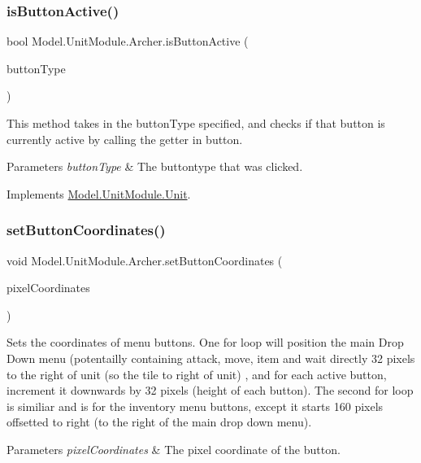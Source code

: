 \subsubsection{\texorpdfstring{is\+Button\+Active()}{isButtonActive()}}
{\footnotesize\ttfamily bool Model.\+Unit\+Module.\+Archer.\+is\+Button\+Active (\begin{DoxyParamCaption}\item[{\hyperlink{namespace_model_ac76b3489c9d704f49912608bd36cd0e7}{Button\+Type}}]{button\+Type }\end{DoxyParamCaption})\hspace{0.3cm}{\ttfamily [inline]}}

This method takes in the button\+Type specified, and checks if that button is currently active by calling the getter in button. 
\begin{DoxyParams}{Parameters}
{\em button\+Type} & The buttontype that was clicked. \\
\hline
\end{DoxyParams}


Implements \hyperlink{interface_model_1_1_unit_module_1_1_unit_a3931ef1523507e7261411dc79ee4e4af}{Model.\+Unit\+Module.\+Unit}.

\hypertarget{class_model_1_1_unit_module_1_1_archer_ad1e9c182bc11a0ea83134421a24c7987}{}\label{class_model_1_1_unit_module_1_1_archer_ad1e9c182bc11a0ea83134421a24c7987} 
\subsubsection{\texorpdfstring{set\+Button\+Coordinates()}{setButtonCoordinates()}}
{\footnotesize\ttfamily void Model.\+Unit\+Module.\+Archer.\+set\+Button\+Coordinates (\begin{DoxyParamCaption}\item[{Vector2}]{pixel\+Coordinates }\end{DoxyParamCaption})\hspace{0.3cm}{\ttfamily [inline]}}

Sets the coordinates of menu buttons. One for loop will position the main Drop Down menu (potentailly containing attack, move, item and wait directly 32 pixels to the right of unit (so the tile to right of unit) , and for each active button, increment it downwards by 32 pixels (height of each button). The second for loop is similiar and is for the inventory menu buttons, except it starts 160 pixels offsetted to right (to the right of the main drop down menu). 
\begin{DoxyParams}{Parameters}
{\em pixel\+Coordinates} & The pixel coordinate of the button. \\
\hline
\end{DoxyParams}


